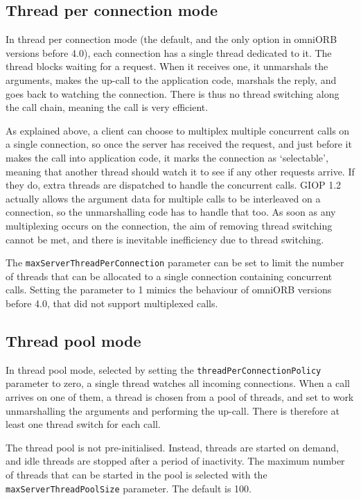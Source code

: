 \documentclass[draft,11pt,twoside,a4paper]{book}
\newcommand{\code}[1]{\texttt{#1}}
\newcommand{\dsc}{\discretionary{}{}{}}
\begin{document}
\subsection{Thread per connection mode}

In thread per connection mode (the default, and the only option in
omniORB versions before 4.0), each connection has a single thread
dedicated to it. The thread blocks waiting for a request. When it
receives one, it unmarshals the arguments, makes the up-call to the
application code, marshals the reply, and goes back to watching the
connection. There is thus no thread switching along the call chain,
meaning the call is very efficient.

As explained above, a client can choose to multiplex multiple
concurrent calls on a single connection, so once the server has
received the request, and just before it makes the call into
application code, it marks the connection as `selectable', meaning
that another thread should watch it to see if any other requests
arrive. If they do, extra threads are dispatched to handle the
concurrent calls. GIOP 1.2 actually allows the argument data for
multiple calls to be interleaved on a connection, so the unmarshalling
code has to handle that too. As soon as any multiplexing occurs on the
connection, the aim of removing thread switching cannot be met, and
there is inevitable inefficiency due to thread switching.

The \code{maxServerThreadPerConnection} parameter can be set to limit
the number of threads that can be allocated to a single connection
containing concurrent calls. Setting the parameter to 1 mimics the
behaviour of omniORB versions before 4.0, that did not support
multiplexed calls.


\subsection{Thread pool mode}
\label{sec:watchConn}

In thread pool mode, selected by setting the
\code{threadPerConnectionPolicy} parameter to zero, a single thread
watches all incoming connections. When a call arrives on one of them,
a thread is chosen from a pool of threads, and set to work
unmarshalling the arguments and performing the up-call. There is
therefore at least one thread switch for each call.

The thread pool is not pre-initialised. Instead, threads are started
on demand, and idle threads are stopped after a period of inactivity.
The maximum number of threads that can be started in the pool is
selected with the \code{maxServerThreadPool\dsc{}Size} parameter. The
default is 100.
\end{document}
